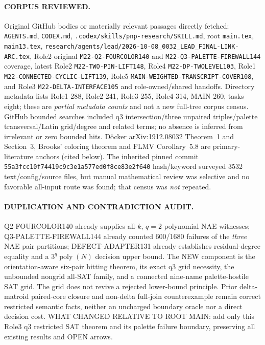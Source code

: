 \documentclass[11pt]{article}
\begin{document}
\paragraph{CORPUS REVIEWED.}
Original GitHub bodies or materially relevant passages directly
fetched: \texttt{AGENTS.md}, \texttt{CODEX.md},
\texttt{.codex/skills/pnp-research/SKILL.md}, root
\texttt{main.tex}, \texttt{main13.tex},
\texttt{research/agents/lead/2026-10-08\_0032\_LEAD\_FINAL-LINK-ARC.tex},
Role2 original \texttt{M22-Q2-FOURCOLOR140} and
\texttt{M22-Q3-PALETTE-FIREWALL144} coverage, latest
Role2 \texttt{M22-TWO-PIN-LIFT148}, Role4
\texttt{M22-DP-TWOLEVEL103}, Role1
\texttt{M22-CONNECTED-CYCLIC-LIFT139},
Role5 \texttt{MAIN-WEIGHTED-TRANSCRIPT-COVER108},
and Role3 \texttt{M22-DELTA-INTERFACE105} and
role-owned/shared handoffs. Directory metadata lists
Role1 288, Role2 241, Role3 255, Role4 314, MAIN 260,
tasks eight; these are \emph{partial metadata counts} and
not a new full-tree corpus census. GitHub bounded searches
included q3 intersection/three unpaired triples/palette
transversal/Latin grid/degree and related terms; no absence
is inferred from irrelevant or zero bounded hits.
D\"ocker arXiv:1912.08032 Theorem~1 and Section~3,
Brooks' coloring theorem and FLMV Corollary~5.8 are
primary-literature anchors (cited below).
The inherited pinned commit
\texttt{55a3fcc10f74419c9c3e1a577ed0f8ce83e2f640}
hash/keyword surveyed 3532 text/config/source files,
but manual mathematical review was selective and no
favorable all-input route was found; that census was
\emph{not} repeated.

\paragraph{DUPLICATION AND CONTRADICTION AUDIT.}
Q2-FOURCOLOR140 already supplies all-$k$, $q=2$
polynomial NAE witnesses; Q3-PALETTE-FIREWALL144
already counted 600/1680 failures of the \emph{three}
NAE pair partitions; DEFECT-ADAPTER131 already
establishes residual-degree equality and a
$3^q\operatorname{poly}(N)$ decision upper bound.
The NEW component is the orientation-aware six-pair
hitting theorem, its exact q3 grid necessity, the
unbounded nongrid all-SAT family, and a connected
nine-name palette-hostile SAT grid. The grid
does not revive a rejected lower-bound principle.
Prior delta-matroid paired-core closure and
non-delta full-join counterexample remain correct
restricted semantic facts, neither an uncharged
boundary oracle nor a direct decision cost.
WHAT CHANGED RELATIVE TO ROOT MAIN: add only
this Role3 q3 restricted SAT theorem and its
palette failure boundary, preserving all existing
results and OPEN arrows.
\end{document}
